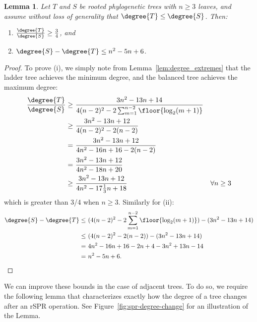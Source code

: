 \documentclass[11pt,onecolumn,conference]{IEEEtran}
\newtheorem{lemma}[theorem]{Lemma}
\newcommand{\cuttable}[1]{#1} %
\begin{document}
\begin{lemma}
	\label{lem:degree_max_delta}
	Let $T$ and $S$ be rooted phylogenetic trees with $n \ge 3$ leaves, and assume without loss of generality that $\degree{T} \le \degree{S}$.
	Then:
	\begin{enumerate}
		\item $\frac{\degree{T}}{\degree{S}} \ge \frac{3}{4}$, and
		\item $\degree{S} - \degree{T} \le n^2 - 5n + 6$.
	\end{enumerate}
\end{lemma}
\begin{proof}
	To prove (i), we simply note from Lemma~\ref{lem:degree_extremes} that the ladder tree achieves the minimum degree, and the balanced tree achieves the maximum degree:
	\begin{align*}
		\frac{\degree{T}}{\degree{S}} \ge\ &\frac{3n^2 - 13n + 14}{4(n-2)^2 - 2 \sum_{m=1}^{n-2} \floor{\log_2(m+1)}} \\
		\ge\ &\frac{3n^2 - 13n + 12}{4(n-2)^2 - 2(n-2)} \\
		\cuttable{= \ &\frac{3n^2 - 13n + 12}{4n^2 - 16n + 16 - 2(n-2)} \\}
		= \ &\frac{3n^2 - 13n + 12}{4n^2 - 18n + 20} \\
		\cuttable{\ge\ &\frac{3n^2 - 13n + 12}{4n^2 - 17\frac{1}{3}n + 18} &\forall n \ge 3 \\}
	\end{align*}
	which is greater than 3/4 when $n \ge 3$.
    Similarly for (ii):
	\begin{align*}
		\cuttable{\degree{S} - \degree{T}
		\le\ &(4(n-2)^2 - 2 \sum_{m=1}^{n-2} \floor{\log_2(m+1)})
		- (3n^2 - 13n + 14) \\}
		\le\ &(4(n-2)^2 - 2(n-2)) - (3n^2 - 13n + 14) \\
		\cuttable{=\ &4n^2 - 16n + 16 - 2n +4 - 3n^2 + 13n - 14 \\}
		=\ &n^2 - 5n + 6.
	\end{align*}
\end{proof}

We can improve these bounds in the case of adjacent trees.
To do so, we require the following lemma that characterizes exactly how the degree of a tree changes after an rSPR operation.
See Figure~\ref{fig:spr-degree-change} for an illustration of the Lemma.
\end{document}
